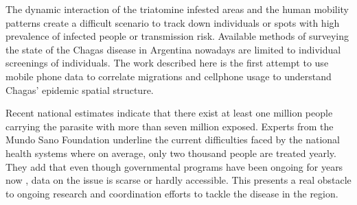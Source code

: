 The dynamic interaction of the triatomine infested areas and the human mobility patterns create a difficult scenario to track down individuals or spots with high prevalence of infected people or transmission risk. Available methods of surveying the state of the Chagas disease in Argentina nowadays are limited to individual screenings of individuals. The work described here is the first attempt to use mobile phone data to correlate migrations and cellphone usage to understand Chagas’ epidemic spatial structure.

Recent national estimates indicate that there exist at least one million people carrying the parasite with more than seven million exposed. Experts from the Mundo Sano Foundation underline the current difficulties faced by the national health systems where on average, only two thousand people are treated yearly. They add that even though governmental programs have been ongoing for years now \cite{plan_nacional_chagas}, data on the issue is scarse or hardly accessible. This presents a real obstacle to ongoing research and coordination efforts to tackle the disease in the region.

